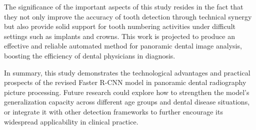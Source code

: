 \documentclass[pdflatex,sn-mathphys-num]{sn-jnl}%
\theoremstyle{thmstyleone}%
\theoremstyle{thmstyletwo}%
\theoremstyle{thmstylethree}%
\begin{document}
The significance of the important aspects of this study resides in the fact that they not only improve the accuracy of tooth detection through technical synergy but also provide solid support for tooth numbering activities under difficult settings such as implants and crowns.  This work is projected to produce an effective and reliable automated method for panoramic dental image analysis, boosting the efficiency of dental physicians in diagnosis.

In summary, this study demonstrates the technological advantages and practical prospects of the revised Faster R-CNN model in panoramic dental radiography picture processing.  Future research could explore how to strengthen the model's generalization capacity across different age groups and dental disease situations, or integrate it with other detection frameworks to further encourage its widespread applicability in clinical practice.





\end{document}
